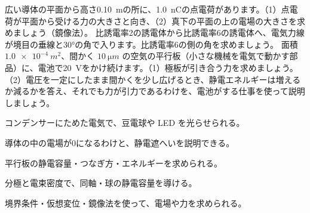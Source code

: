 \bkproblem 広い導体の平面から高さ\qty{0.10}{m}の所に、\qty{1.0}{nC}の点電荷があります。（1）点電荷が平面から受ける力の大きさと向き、（2）真下の平面の上の電場の大きさを求めましょう（鏡像法）。
\bkproblem 比誘電率2の誘電体から比誘電率6の誘電体へ、電気力線が境目の垂線と30°の角で入ります。比誘電率6の側の角を求めましょう。
\bkproblem 面積 $\qty{1.0e-4}{m^2}$、間かく $\qty{10}{\micro m}$ の空気の平行板（小さな機械を電気で動かす部品）に、電池で\qty{20}{V}をかけ続けます。（1）極板が引き合う力を求めましょう。（2）電圧を一定にしたまま間かくを少し広げるとき、静電エネルギーは増えるか減るかを答え、それでも力が引力であるわけを、電池がする仕事を使って説明しましょう。

\begin{furikaeri}
\begin{checklist}
\item コンデンサーにためた電気で、豆電球や LED を光らせられる。
\item 導体の中の電場が0になるわけと、静電遮へいを説明できる。
\item 平行板の静電容量・つなぎ方・エネルギーを求められる。
\item 分極と電束密度で、同軸・球の静電容量を導ける。
\item 境界条件・仮想変位・鏡像法を使って、電場や力を求められる。
\end{checklist}
\end{furikaeri}
